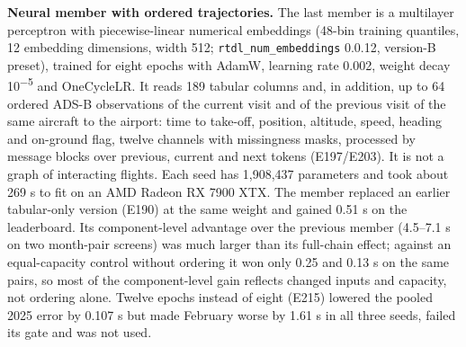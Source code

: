 \documentclass[
  manuscript=article,  %
  layout=preprint,     %
  year=2026,
  volume=4,
]{extra/joas}
\begin{document}
\textbf{Neural member with ordered trajectories.} The last member is a multilayer perceptron with piecewise-linear numerical embeddings \autocite{gorishniy2022embeddings} (48-bin training quantiles, 12 embedding dimensions, width 512; \texttt{rtdl\_\allowbreak{}num\_\allowbreak{}embeddings} 0.0.12, version-B preset), trained for eight epochs with AdamW, learning rate 0.002, weight decay 10\textsuperscript{$-$5} and OneCycleLR. It reads 189 tabular columns and, in addition, up to 64 ordered ADS-B observations of the current visit and of the previous visit of the same aircraft to the airport: time to take-off, position, altitude, speed, heading and on-ground flag, twelve channels with missingness masks, processed by message blocks over previous, current and next tokens (E197/E203). It is not a graph of interacting flights. Each seed has 1,908,437 parameters and took about 269 s to fit on an AMD Radeon RX 7900 XTX. The member replaced an earlier tabular-only version (E190) at the same weight and gained 0.51 s on the leaderboard. Its component-level advantage over the previous member (4.5--7.1 s on two month-pair screens) was much larger than its full-chain effect; against an equal-capacity control without ordering it won only 0.25 and 0.13 s on the same pairs, so most of the component-level gain reflects changed inputs and capacity, not ordering alone. Twelve epochs instead of eight (E215) lowered the pooled 2025 error by 0.107 s but made February worse by 1.61 s in all three seeds, failed its gate and was not used.
\end{document}
